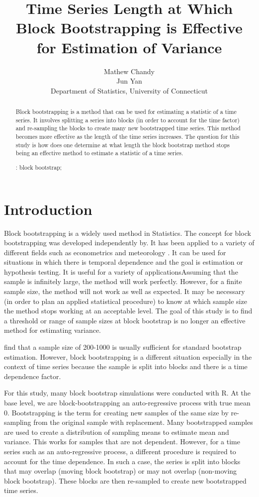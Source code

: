\documentclass[12pt, letterpaper, titlepage]{article}
\title{Time Series Length at Which Block Bootstrapping is Effective for Estimation of Variance}
\author{Mathew Chandy\\
  Jun Yan\\[1ex]
  Department of Statistics, University of Connecticut\\
}
\date{}
\begin{document}
 
\maketitle

\doublespace

\begin{abstract}
Block bootstrapping is a method that can be used for estimating a statistic of a time
series. It involves splitting a series into blocks (in order to account for the time
factor) and re-sampling the blocks to create many new bootstrapped time series.
This method becomes more effective as the length of the time series increases. 
The question for this study is how does one determine at what length the block
bootstrap method stops being an effective method to estimate a statistic of a time
series.

\bigskip
\noindent{}:
block bootstrap;
\end{abstract}

\section{Introduction}
\label{sec:intro}

Block bootstrapping is a widely used method in Statistics. The concept for block 
bootstrapping was developed independently by. It has been applied to a variety of 
different fields such 
as econometrics \citep{MacKinnon} and meteorology \citep{Varga}. It can be used for 
situations in which there is temporal dependence and the goal is estimation or hypothesis 
testing. It is useful for a variety of applicationsAssuming that the sample is infinitely 
large, the method will work perfectly. However, for a finite sample size, the method will 
not work as well as expected. It may be necessary (in order to plan an applied 
statistical 
procedure) to know at which sample size the method stops working at an acceptable level. 
The goal of this study is to find a threshold or range of sample sizes at block bootstrap 
is no longer an effective method for estimating variance.

\citet{Nevitt} find that a sample size of 200-1000 is usually sufficient for standard 
bootstrap estimation. However, block bootstrapping is a different situation especially in 
the context of time series because the sample is split into blocks and there is a time 
dependence factor.

For this study, many block bootstrap simulations were conducted with R. At the base
level, we are block-bootstrapping an auto-regressive process with true mean 0.
Bootstrapping is the term for creating new samples of the same size by re-sampling from
the original sample with replacement. Many bootstrapped samples are used to create a
distribution of sampling means to estimate mean and variance. This works for samples
that are not dependent. However, for a time series such as an auto-regressive process,
a different procedure is required to account for the time dependence. In such a case,
the series is split into blocks that may overlap (moving block bootstrap) or may not
overlap (non-moving block bootstrap). These blocks are then re-sampled to create new
bootstrapped time series. 
\end{document}
